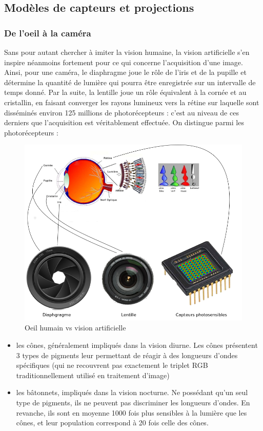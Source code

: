  \subsection{Modèles de capteurs et projections} \label{chap0-3-0}
 
 \subsubsection{De l'oeil à la caméra} \label{chap0-3-0-0}
 
 Sans pour autant chercher à imiter la vision humaine, la vision artificielle 
s'en inspire néanmoins fortement pour ce qui concerne l'acquisition d'une image. 
Ainsi, pour une caméra, le diaphragme joue le rôle de l'iris et de la pupille et 
détermine la quantité de lumière qui pourra être enregistrée sur un intervalle 
de temps donné. Par la suite, la lentille joue un rôle équivalent à la cornée et 
au cristallin, en faisant converger les rayons lumineux vers la rétine sur 
laquelle sont disséminés environ 125 millions de photorécepteurs : c'est au 
niveau de ces derniers que l'acquisition est véritablement effectuée. On 
distingue parmi les photorécepteurs :
 \begin{figure}[htp]
  \centering
  \includegraphics[width=.85\linewidth]{./intro/figures/oeil.png}
    \caption{\footnotesize{Oeil humain vs vision artificielle}}
\label{intro:fig11b}
\end{figure}

 \begin{itemize}
  \item les cônes, généralement impliqués dans la vision diurne. Les cônes 
présentent 3 types de pigments leur permettant de réagir à des longueurs d'ondes 
spécifiques (qui ne recouvrent pas exactement le triplet RGB traditionnellement 
utilisé en traitement d'image)
  \item les bâtonnets, impliqués dans la vision nocturne. Ne possédant qu'un 
seul type de pigments, ils ne peuvent pas discriminer les longueurs d'ondes. En 
revanche, ils sont en moyenne 1000 fois plus sensibles à la lumière que les 
cônes, et leur population correspond à 20 fois celle des cônes.
 \end{itemize}

